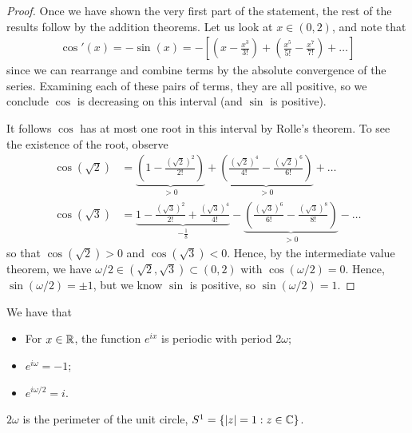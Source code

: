 \documentclass{../../template/note}
\begin{document}
    \begin{proof}
        Once we have shown the very first part of the statement, the rest of the results follow by the addition theorems. Let us look at \(x \in (0, 2)\), and note that
        \begin{align*}
            \cos'(x) = -\sin(x) = -\left[\left(x-\frac{x^3}{3!}\right)+\left(\frac{x^5}{5!}-\frac{x^7}{7!}\right)+\dots\right]
        \end{align*}
        since we can rearrange and combine terms by the absolute convergence of the series. Examining each of these pairs of terms, they are all positive, so we conclude \(\cos\) is decreasing on this interval (and \(\sin\) is positive).

        It follows \(\cos\) has at most one root in this interval by Rolle's theorem. To see the existence of the root, observe
        \begin{align*}
            \cos(\sqrt 2) &= \underbrace{\left(1 - \frac{(\sqrt 2)^2}{2!}\right)}_{>0} + \underbrace{\left(\frac{(\sqrt 2)^4}{4!} - \frac{(\sqrt 2)^6}{6!}\right)}_{>0} + \dots \\
            \cos(\sqrt 3) &= \underbrace{1 - \frac{(\sqrt 3)^2}{2!} + \frac{(\sqrt 3)^4}{4!}}_{-\frac 1 8} - \underbrace{\left(\frac{(\sqrt 3)^6}{6!}-\frac{(\sqrt 3)^8}{8!}\right)}_{>0} - \dots
        \end{align*}
        so that \(\cos(\sqrt 2) > 0\) and \(\cos(\sqrt 3) < 0\). Hence, by the intermediate value theorem, we have \(\omega/2 \in (\sqrt 2, \sqrt 3) \subset (0, 2)\) with \(\cos(\omega/2) = 0\). Hence, \(\sin(\omega/2) = \pm 1\), but we know \(\sin\) is positive, so \(\sin(\omega/2)=1\).
    \end{proof}
    
    \begin{corollary}
        We have that
        \begin{itemize}
            \item For \(x \in \mathbb R\), the function \(e^{ix}\) is periodic with period \(2\omega\);
            \item \(e^{i\omega} = -1\);
            \item \(e^{i\omega/2} = i\).
        \end{itemize}
    \end{corollary}
    
    \begin{lemma}
        \(2\omega\) is the perimeter of the unit circle, \(S^1 = \{|z| = 1: z \in \mathbb C\}\).
    \end{lemma}
    
\end{document}
